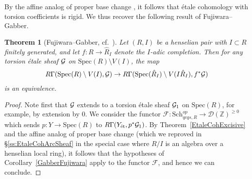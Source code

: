 \documentclass[reqno]{amsart}
\newcommand{\sF}{\mathcal{F}}
\newcommand{\spec}{\mathrm{Spec}}
\newcommand{\et}{\mathrm{\acute{e}t}}
\newcommand{\D}{\mathcal{D}}
\newtheorem{theorem}{Theorem}[section]
\theoremstyle{definition}
\begin{document}
By the affine analog of proper base change \cite{Gabber, Huber}, it follows that \'etale cohomology
with torsion coefficients is rigid. 
We thus recover the following result of Fujiwara--Gabber. 
\begin{theorem}[{Fujiwara--Gabber, cf.~\cite[Cor.~6.6.4]{Fujiwara}}] 
\label{GabberFujiwarathm}
Let $(R, I)$ be a henselian pair with $I \subset R$ finitely generated, and let
$f \colon R \to \hat{R}_I$ denote the $I$-adic completion. Then for any torsion
\'etale sheaf $\mathcal{G}$ on $\spec(R) \setminus V(I)$, the map 
\[ R \Gamma( \spec(R) \setminus V(I),\sG) \to 
R \Gamma( \spec ( \hat{R}_I) \setminus V( I \hat{R}_I), f^* \sG)
\]
is an equivalence. 
\end{theorem} 
\begin{proof} 
Note first that $\mathcal{G}$ extends to a torsion \'etale sheaf $\mathcal{G}_1$ on $\spec(R)$, for example, by extension by $0$.
We consider the functor 
$\sF\colon  
\mathrm{Sch}_{qcqs,R}^{op} \to \D(\mathbb{Z})^{\geq 0}$ which sends $p\colon  Y \to \spec(R)$ to $R
\Gamma( Y_{\et}, p^* \sG_1)$. 
By Theorem~\ref{EtaleCohExcisive} and the affine analog of proper base change 
\cite{Gabber, Huber} (which we reproved in \S \ref{ss:EtaleCohArcSheaf} in the
special case where $R/I$ is an algebra over a henselian local ring), it follows that 
the hypotheses of Corollary~\ref{GabberFujiwara} 
apply to the functor $\sF$, and hence we can conclude. 
\end{proof} 
\end{document}
